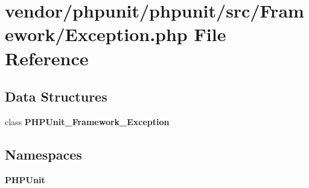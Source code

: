 \section{vendor/phpunit/phpunit/src/\+Framework/\+Exception.php File Reference}
\label{phpunit_2phpunit_2src_2_framework_2_exception_8php}
\subsection*{Data Structures}
\begin{DoxyCompactItemize}
\item 
class {\bf P\+H\+P\+Unit\+\_\+\+Framework\+\_\+\+Exception}
\end{DoxyCompactItemize}
\subsection*{Namespaces}
\begin{DoxyCompactItemize}
\item 
 {\bf P\+H\+P\+Unit}
\end{DoxyCompactItemize}
